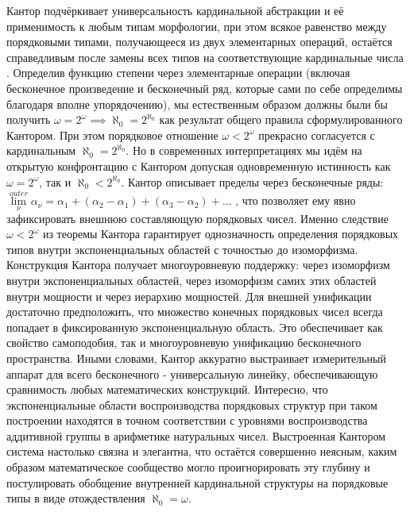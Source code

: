 \documentclass[12pt]{article}
\begin{document}
Кантор подчёркивает универсальность кардинальной абстракции и её применимость к любым типам морфологии, при этом всякое равенство между порядковыми типами, получающееся из двух элементарных операций, остаётся справедливым после замены всех типов на соответствующие кардинальные числа \cite{cantor-cardinal-universality}. Определив функцию степени через элементарные операции (включая бесконечное произведение и бесконечный ряд, которые сами по себе определимы благодаря вполне упорядочению), мы естественным образом должны были бы получить $\omega = 2^\omega \implies \aleph_0 = 2^{\aleph_0}$ как результат общего правила сформулированного Кантором. При этом порядковое отношение $\omega < 2^\omega$ прекрасно согласуется с кардинальным $\aleph_0 = 2^{\aleph_0}$. Но в современных интерпретациях мы идём на открытую конфронтацию с Кантором допуская одновременную истинность как $\omega = 2^\omega$, так и $\aleph_0 < 2^{\aleph_0}$. Кантор описывает пределы через бесконечные ряды: $\lim\limits_{\nu}^{outer} \alpha_{\nu} = \alpha_1 + (\alpha_2 - \alpha_1) + (\alpha_3 - \alpha_2) + \dots$ \cite{cantor-limit}, что позволяет ему явно зафиксировать внешнюю составляющую порядковых чисел. Именно следствие $\omega < 2^\omega$ из теоремы Кантора гарантирует однозначность определения порядковых типов внутри экспоненциальных областей с точностью до изоморфизма. Конструкция Кантора получает многоуровневую поддержку: через изоморфизм внутри экспоненциальных областей, через изоморфизм самих этих областей внутри мощности и через иерархию мощностей. Для внешней унификации достаточно предположить, что множество конечных порядковых чисел всегда попадает в фиксированную экспоненциальную область. Это обеспечивает как свойство самоподобия, так и многоуровневую унификацию бесконечного пространства. Иными словами, Кантор аккуратно выстраивает измерительный аппарат для всего бесконечного - универсальную линейку, обеспечивающую сравнимость любых математических конструкций. Интересно, что экспоненциальные области воспроизводства порядковых структур при таком построении находятся в точном соответствии с уровнями воспроизводства аддитивной группы в арифметике натуральных чисел. Выстроенная Кантором система настолько связна и элегантна, что остаётся совершенно неясным, каким образом математическое сообщество могло проигнорировать эту глубину и постулировать обобщение внутренней кардинальной структуры на порядковые типы в виде отождествления $\aleph_0 = \omega$.
\end{document}
